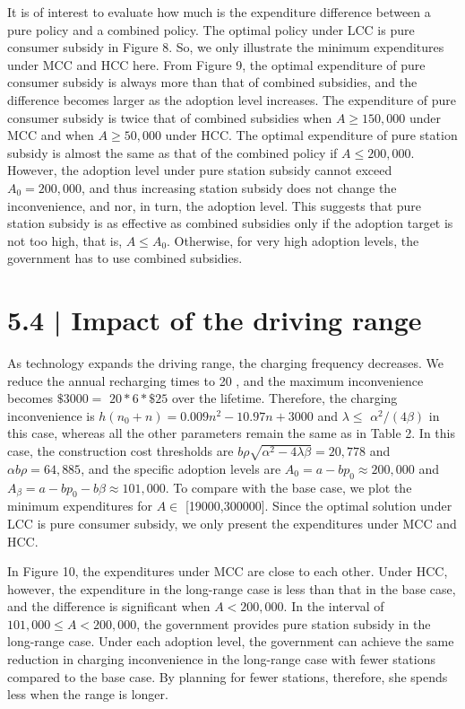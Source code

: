 \documentclass[10pt]{article}
\begin{document}
It is of interest to evaluate how much is the expenditure difference between a pure policy and a combined policy. The optimal policy under LCC is pure consumer subsidy in Figure 8. So, we only illustrate the minimum expenditures under MCC and HCC here. From Figure 9, the optimal expenditure of pure consumer subsidy is always more than that of combined subsidies, and the difference becomes larger as the adoption level increases. The expenditure of pure consumer subsidy is twice that of combined subsidies when $A \geq 150,000$ under MCC and when $A \geq 50,000$ under HCC. The optimal expenditure of pure station subsidy is almost the same as that of the combined policy if $A \leq 200,000$. However, the adoption level under pure station subsidy cannot exceed $A_{0}=200,000$, and thus increasing station subsidy does not change the inconvenience, and nor, in turn, the adoption level. This suggests that pure station subsidy is as effective as combined subsidies only if the adoption target is not too high, that is, $A \leq A_{0}$. Otherwise, for very high adoption levels, the government has to use combined subsidies.

\section*{5.4 | Impact of the driving range}
As technology expands the driving range, the charging frequency decreases. We reduce the annual recharging times to 20 , and the maximum inconvenience becomes $\$ 3000=$ $20 * 6 * \$ 25$ over the lifetime. Therefore, the charging inconvenience is $h\left(n_{0}+n\right)=0.009 n^{2}-10.97 n+3000$ and $\lambda \leq$ $\alpha^{2} /(4 \beta)$ in this case, whereas all the other parameters remain the same as in Table 2. In this case, the construction cost thresholds are $b \rho \sqrt{\alpha^{2}-4 \lambda \beta}=20,778$ and $\alpha b \rho=64,885$, and the specific adoption levels are $A_{0}=a-b p_{0} \approx 200,000$ and $A_{\beta}=a-b p_{0}-b \beta \approx 101,000$. To compare with the base case, we plot the minimum expenditures for $A \in$ [19000,300000]. Since the optimal solution under LCC is pure consumer subsidy, we only present the expenditures under MCC and HCC.

In Figure 10, the expenditures under MCC are close to each other. Under HCC, however, the expenditure in the long-range case is less than that in the base case, and the difference is significant when $A<200,000$. In the interval of $101,000 \leq A<200,000$, the government provides pure station subsidy in the long-range case. Under each adoption level, the government can achieve the same reduction in charging inconvenience in the long-range case with fewer stations compared to the base case. By planning for fewer stations, therefore, she spends less when the range is longer.
\end{document}
